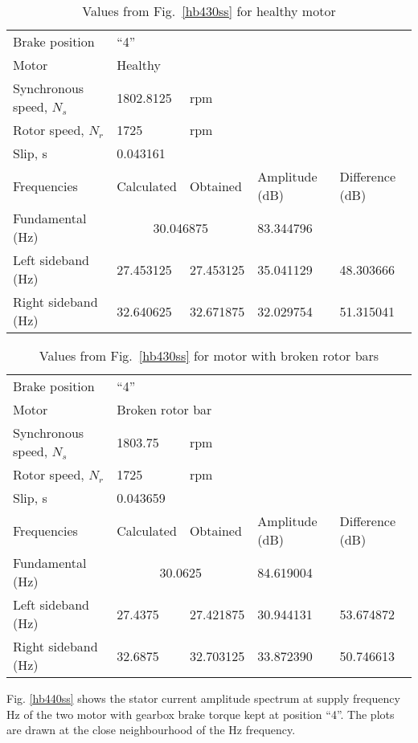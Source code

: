\documentclass[a4paper,11pt]{report}
\begin{document}
\begin{table}[h]
\centering
\begin{tabular}{lllll}
Brake position	& ``4'' & & & \\			
Motor &	\multicolumn{4}{l}{Healthy} \\ 
Synchronous speed, $N_{s}$	& 1802.8125& rpm & & \\			
Rotor speed, $N_{r}$ 	  	& 1725	& rpm& & \\		
Slip, s			  	&  \multicolumn{4}{l}{0.043161} \\			
Frequencies 		  	& Calculated & Obtained & Amplitude (dB) & Difference (dB) \\
Fundamental (Hz)		& \multicolumn{2}{c}{30.046875}	& 83.344796 &  \\ 
Left sideband (Hz) 		& 27.453125 & 27.453125 & 35.041129 & 48.303666 \\
Right sideband (Hz)		& 32.640625 & 32.671875 & 32.029754 & 51.315041 
\end{tabular}
\caption{Values from Fig.~\ref{hb430ss} for healthy motor} \label{h430sst}
\end{table}

\begin{table}[h]
\centering
\begin{tabular}{lllll}
Brake position	& ``4'' & & & \\			
Motor &	\multicolumn{4}{l}{Broken rotor	bar} \\ 
Synchronous speed, $N_{s}$	& 1803.75	& rpm & & \\			
Rotor speed, $N_{r}$ 	  	& 1725	& rpm& & \\		
Slip, s			  	&  \multicolumn{4}{l}{0.043659} \\			
Frequencies 		  	& Calculated & Obtained & Amplitude (dB) & Difference (dB) \\
Fundamental (Hz)		& \multicolumn{2}{c}{30.0625}& 84.619004 &  \\ 
Left sideband (Hz) 		& 27.4375 & 27.421875 & 30.944131 & 53.674872 \\
Right sideband (Hz)		& 32.6875 & 32.703125 & 33.872390 & 50.746613 
\end{tabular}
\caption{Values from Fig.~\ref{hb430ss} for motor with broken rotor bars} \label{b430sst}
\end{table}

\clearpage
Fig. \ref{hb440ss} shows the stator current amplitude spectrum at supply frequency \unit[40]{Hz} of the two motor with gearbox brake torque kept at position ``4''. The plots are drawn at the close neighbourhood of the \unit[40]{Hz} frequency.
\end{document}
